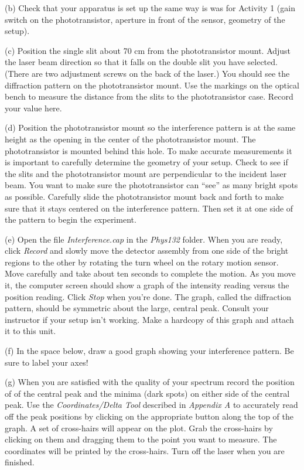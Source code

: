 (b) Check that your apparatus is set up the same way is was for Activity 1 (gain switch on the phototransistor,
aperture in front of the sensor, geometry of the setup).

(c) Position the single slit about 70 cm from the phototransistor mount. Adjust 
the laser beam direction so that it falls on the double slit you have selected. 
(There are two adjustment screws on the back of the laser.) 
You should see the diffraction pattern on the phototransistor mount. 
Use the markings on the optical bench to measure the distance from the slits
to the phototransistor case.
Record your value here.
\vspace{10mm}

(d) Position the phototransistor mount so the interference pattern
is at the same height as the opening in the center of the phototransistor mount. 
The phototransistor is mounted behind this hole. 
To make accurate measurements it is important to carefully determine the geometry of your setup. 
Check to see if the slits and the phototransistor mount are perpendicular to the incident
laser beam.  You want to make sure the phototransistor can {}``see'' as many
bright spots as possible. Carefully slide the phototransistor mount 
back and forth to make sure that it stays centered on the interference pattern. 
Then set it at one side of the pattern to begin the experiment.

(e) Open the file {\it Interference.cap} in the {\it Phys132} folder. 
When you are ready, click {\it Record} and slowly move the
detector assembly from one side of the bright regions to the other by rotating the turn wheel on the rotary motion
sensor. Move carefully and take about ten seconds to complete the motion. As you move it, the computer screen
should show a graph of the intensity reading versus the position reading. Click {\it Stop} when you’re done. The
graph, called the diffraction pattern, should be symmetric about the large, central peak. Consult your instructor
if your setup isn’t working.
Make a hardcopy of this graph and attach it to this unit.

(f) In the space below, draw a good graph showing your interference pattern. Be sure to label your axes!
\vspace{25mm}

(g) When you are satisfied with the quality of your spectrum record the 
position of of the central peak and the minima (dark spots) on either side of the central peak.
Use the {\it Coordinates/Delta Tool} 
described in {\it Appendix A} to accurately read off 
the peak positions by clicking on the appropriate button along the top of the 
graph. A set of cross-hairs will appear on the plot. Grab the cross-hairs by 
clicking on them and dragging them to the point you want to measure.
The coordinates will be printed by the cross-hairs.
Turn off the laser when you are finished.
\vspace{25mm}

